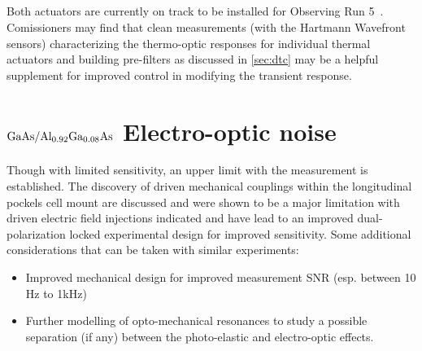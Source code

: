 \subsection*{}
Both actuators are currently on track to be installed for Observing Run 5~\cite{O5TCSsummary}. Comissioners may find that clean measurements (with the Hartmann Wavefront sensors) characterizing the thermo-optic responses for individual thermal actuators and building pre-filters as discussed in \autoref{sec:dtc} may be a helpful supplement for improved control in modifying the transient response.

\section{\texorpdfstring{$\mathrm{GaAs} / \mathrm{Al_{0.92}Ga_{0.08}As}$}{gaas/algaas} Electro-optic noise}
Though with limited sensitivity, an upper limit with the measurement is established. The discovery of driven mechanical couplings within the longitudinal pockels cell mount are discussed and were shown to be a major limitation with driven electric field injections indicated and have lead to an improved dual-polarization locked experimental design for improved sensitivity. Some additional considerations that can be taken with similar experiments:

\begin{itemize}
	\item Improved mechanical design for improved measurement SNR (esp. between 10 Hz to 1kHz)
	\item Further modelling of opto-mechanical resonances to study a possible separation (if any) between the photo-elastic and electro-optic effects.  
\end{itemize}
